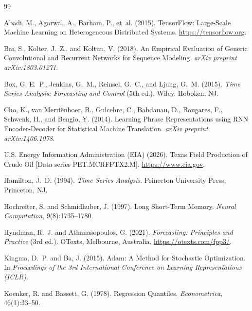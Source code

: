 \documentclass[12pt,a4paper]{article}
\begin{document}
\begin{thebibliography}{99}

Abadi, M., Agarwal, A., Barham, P., et~al. (2015).
\newblock TensorFlow: Large-Scale Machine Learning on Heterogeneous Distributed Systems.
\newblock \url{https://tensorflow.org}.

Bai, S., Kolter, J.~Z., and Koltun, V. (2018).
\newblock An Empirical Evaluation of Generic Convolutional and Recurrent Networks for Sequence Modeling.
\newblock \emph{arXiv preprint arXiv:1803.01271}.

Box, G. E.~P., Jenkins, G.~M., Reinsel, G.~C., and Ljung, G.~M. (2015).
\newblock \emph{Time Series Analysis: Forecasting and Control} (5th ed.).
\newblock Wiley, Hoboken, NJ.

Cho, K., van Merri{\"e}nboer, B., Gulcehre, C., Bahdanau, D., Bougares, F., Schwenk, H., and Bengio, Y. (2014).
\newblock Learning Phrase Representations using RNN Encoder-Decoder for Statistical Machine Translation.
\newblock \emph{arXiv preprint arXiv:1406.1078}.

U.S. Energy Information Administration (EIA) (2026).
\newblock Texas Field Production of Crude Oil [Data series PET.MCRFPTX2.M].
\newblock \url{https://www.eia.gov}.

Hamilton, J.~D. (1994).
\newblock \emph{Time Series Analysis}.
\newblock Princeton University Press, Princeton, NJ.

Hochreiter, S. and Schmidhuber, J. (1997).
\newblock Long Short-Term Memory.
\newblock \emph{Neural Computation}, 9(8):1735--1780.

Hyndman, R.~J. and Athanasopoulos, G. (2021).
\newblock \emph{Forecasting: Principles and Practice} (3rd ed.).
\newblock OTexts, Melbourne, Australia.
\newblock \url{https://otexts.com/fpp3/}.

Kingma, D.~P. and Ba, J. (2015).
\newblock Adam: A Method for Stochastic Optimization.
\newblock In \emph{Proceedings of the 3rd International Conference on Learning Representations (ICLR)}.

Koenker, R. and Bassett, G. (1978).
\newblock Regression Quantiles.
\newblock \emph{Econometrica}, 46(1):33--50.


\end{thebibliography}
\end{document}
